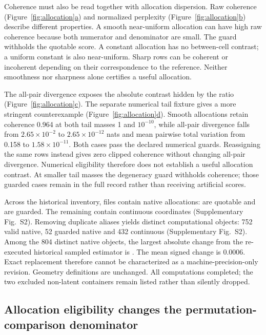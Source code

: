 \documentclass[11pt]{article}
\newcommand{\figpanel}[2]{Figure~\hyperref[#1]{\ref*{#1}#2}}
\begin{document}
Coherence must also be read together with allocation dispersion. Raw coherence (\figpanel{fig:allocation}{a}) and normalized perplexity (\figpanel{fig:allocation}{b}) describe different properties. A smooth near-uniform allocation can have high raw coherence because both numerator and denominator are small. The guard withholds the quotable score. A constant allocation has no between-cell contrast; a uniform constant is also near-uniform. Sharp rows can be coherent or incoherent depending on their correspondence to the reference. Neither smoothness nor sharpness alone certifies a useful allocation.

The all-pair divergence exposes the absolute contrast hidden by the ratio (\figpanel{fig:allocation}{c}). The separate numerical tail fixture gives a more stringent counterexample (\figpanel{fig:allocation}{d}). Smooth allocations retain coherence 0.964 at both tail masses 1 and $10^{-10}$, while all-pair divergence falls from $2.65\times10^{-2}$ to $2.65\times10^{-12}$ nats and mean pairwise total variation from 0.158 to $1.58\times10^{-11}$. Both cases pass the declared numerical guards. Reassigning the same rows instead gives zero clipped coherence without changing all-pair divergence. Numerical eligibility therefore does not establish a useful allocation contrast. At smaller tail masses the degeneracy guard withholds coherence; those guarded cases remain in the full record rather than receiving artificial scores.



Across the historical inventory, \NativeFiles{} files contain native allocations: \ValidNativeFiles{} are quotable and \GuardedNativeFiles{} are guarded. The remaining \NonNativeFiles{} contain continuous coordinates (Supplementary Fig.~S2). Removing duplicate aliases yields \UniqueScores{} distinct computational objects: 752 valid native, 52 guarded native and 432 continuous (Supplementary Fig.~S2). Among the 804 distinct native objects, the largest absolute change from the re-executed historical sampled estimator is \MaxExactDelta{}. The mean signed change is 0.0006. Exact replacement therefore cannot be characterized as a machine-precision-only revision. Geometry definitions are unchanged. All \UniqueScores{} computations completed; the two excluded non-latent containers remain listed rather than silently dropped.

\subsection{Allocation eligibility changes the permutation-comparison denominator}
\end{document}
